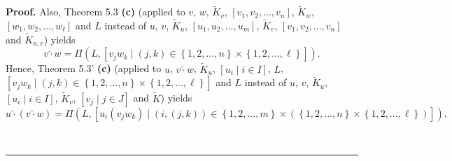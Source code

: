 \documentclass[numbers=enddot,12pt,final,onecolumn,notitlepage]{scrartcl}%
\newenvironment{proof}[1][Proof]{\noindent\textbf{#1.} }{\ \rule{0.5em}{0.5em}}
\begin{document}
\begin{proof}
Also, Theorem 5.3 \textbf{(c)} (applied to $v$, $w$, $\widetilde{K}_{v}$,
$\left[  v_{1},v_{2},\ldots,v_{n}\right]  $, $\widetilde{K}_{w}$, $\left[
w_{1},w_{2},\ldots,w_{\ell}\right]  $ and $L$ instead of $u$, $v$,
$\widetilde{K}_{u}$, $\left[  u_{1},u_{2},\ldots,u_{m}\right]  $,
$\widetilde{K}_{v}$, $\left[  v_{1},v_{2},\ldots,v_{n}\right]  $ and
$\widetilde{K}_{u,v}$) yields%
\[
v\widehat{\cdot}w=\Pi\left(  L,\left[  v_{j}w_{k}\mid\left(  j,k\right)
\in\left\{  1,2,...,n\right\}  \times\left\{  1,2,...,\ell\right\}  \right]
\right)  .
\]
Hence, Theorem 5.3' \textbf{(c)} (applied to $u$, $v\widehat{\cdot}w$,
$\widetilde{K}_{u}$, $\left[  u_{i}\mid i\in I\right]  $, $L$, $\left[
v_{j}w_{k}\mid\left(  j,k\right)  \in\left\{  1,2,...,n\right\}
\times\left\{  1,2,...,\ell\right\}  \right]  $ and $L$ instead of $u$, $v$,
$\widetilde{K}_{u}$, $\left[  u_{i}\mid i\in I\right]  $, $\widetilde{K}_{v}$,
$\left[  v_{j}\mid j\in J\right]  $ and $\widetilde{K}$) yields%
\[
u\widehat{\cdot}\left(  v\widehat{\cdot}w\right)  =\Pi\left(  L,\left[
u_{i}\left(  v_{j}w_{k}\right)  \mid\left(  i,\left(  j,k\right)  \right)
\in\left\{  1,2,...,m\right\}  \times\left(  \left\{  1,2,...,n\right\}
\times\left\{  1,2,...,\ell\right\}  \right)  \right]  \right)  .
\]



\end{proof}
\end{document}
